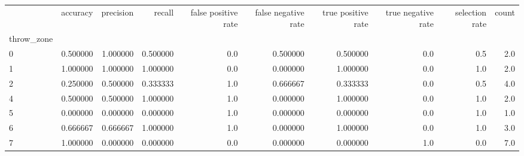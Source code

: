 \begin{tabular}{lrrrrrrrrr}
\toprule
{} &  accuracy &  precision &    recall &  false positive rate &  false negative rate &  true positive rate &  true negative rate &  selection rate &  count \\
throw\_zone &           &            &           &                      &                      &                     &                     &                 &        \\
\midrule
0          &  0.500000 &   1.000000 &  0.500000 &                  0.0 &             0.500000 &            0.500000 &                 0.0 &             0.5 &    2.0 \\
1          &  1.000000 &   1.000000 &  1.000000 &                  0.0 &             0.000000 &            1.000000 &                 0.0 &             1.0 &    2.0 \\
2          &  0.250000 &   0.500000 &  0.333333 &                  1.0 &             0.666667 &            0.333333 &                 0.0 &             0.5 &    4.0 \\
4          &  0.500000 &   0.500000 &  1.000000 &                  1.0 &             0.000000 &            1.000000 &                 0.0 &             1.0 &    2.0 \\
5          &  0.000000 &   0.000000 &  0.000000 &                  1.0 &             0.000000 &            0.000000 &                 0.0 &             1.0 &    1.0 \\
6          &  0.666667 &   0.666667 &  1.000000 &                  1.0 &             0.000000 &            1.000000 &                 0.0 &             1.0 &    3.0 \\
7          &  1.000000 &   0.000000 &  0.000000 &                  0.0 &             0.000000 &            0.000000 &                 1.0 &             0.0 &    7.0 \\
\bottomrule
\end{tabular}
